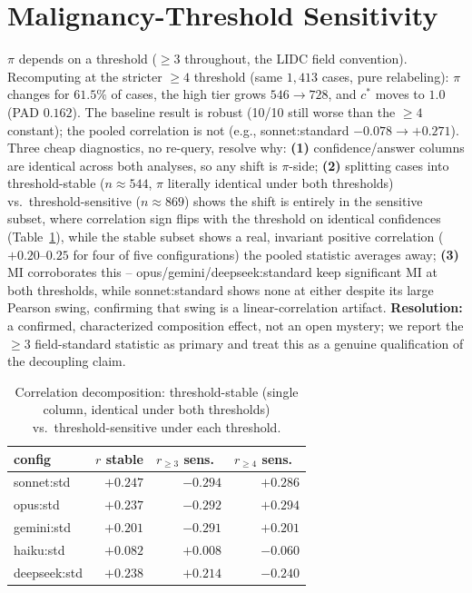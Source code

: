 \documentclass[letterpaper]{article} %
\begin{document}
\section{Malignancy-Threshold Sensitivity}
\label{app:threshold}
$\pi$ depends on a threshold ($\geq3$ throughout, the LIDC field convention).
Recomputing at the stricter $\geq4$ threshold (same $1{,}413$ cases, pure
relabeling): $\pi$ changes for $61.5\%$ of cases, the high tier grows
$546{\to}728$, and $c^\ast$ moves to $1.0$ (PAD $0.162$). The baseline result
is robust (10/10 still worse than the $\geq4$ constant); the pooled
correlation is not (e.g., sonnet:standard $-0.078{\to}+0.271$). Three cheap
diagnostics, no re-query, resolve why: \textbf{(1)} confidence/answer
columns are identical across both analyses, so any shift is $\pi$-side;
\textbf{(2)} splitting cases into threshold-stable ($n{\approx}544$, $\pi$
literally identical under both thresholds) vs.\ threshold-sensitive
($n{\approx}869$) shows the shift is entirely in the sensitive subset,
where correlation sign flips with the threshold on identical confidences
(Table~\ref{tab:threshold-decomp}), while the stable subset shows a real,
invariant positive correlation ($+0.20$--$0.25$ for four of five
configurations) the pooled statistic averages away; \textbf{(3)} MI
corroborates this -- opus/gemini/deepseek:standard keep significant MI at
both thresholds, while sonnet:standard shows none at either despite its
large Pearson swing, confirming that swing is a linear-correlation
artifact. \textbf{Resolution:} a confirmed, characterized composition
effect, not an open mystery; we report the $\geq3$ field-standard statistic
as primary and treat this as a genuine qualification of the decoupling
claim.

\begin{table}[t]
\centering
\small
\begin{tabular}{lrrr}
\toprule
config & $r$ stable & $r_{\geq3}$ sens.\ & $r_{\geq4}$ sens.\ \\
\midrule
sonnet:std   & $+0.247$ & $-0.294$ & $+0.286$ \\
opus:std     & $+0.237$ & $-0.292$ & $+0.294$ \\
gemini:std   & $+0.201$ & $-0.291$ & $+0.201$ \\
haiku:std    & $+0.082$ & $+0.008$ & $-0.060$ \\
deepseek:std & $+0.238$ & $+0.214$ & $-0.240$ \\
\bottomrule
\end{tabular}
\caption{Correlation decomposition: threshold-stable (single column, identical under both thresholds) vs.\ threshold-sensitive under each threshold.}
\label{tab:threshold-decomp}
\end{table}
\end{document}
